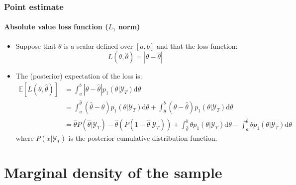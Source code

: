 \documentclass[10pt,slidestop]{beamer}
\newcommand{\AllSample}{ \mathcal Y_T }
\begin{document}
\begin{frame}
  \frametitle{Point estimate}
  \framesubtitle{Absolute value loss function ($L_1$ norm)}
  \begin{itemize}
  \item Suppose that $\theta$ is a scalar defined over $[a,b]$ and
    that the loss function:
    \[
    L(\theta,\widehat{\theta}) = |\theta-\widehat{\theta}|
    \]
  \item The (posterior) expectation of the loss is:
    \medskip
    {\tiny\[
    \begin{split}
      \mathbb  E \left[L(\theta,\widehat{\theta})\right] &=
      \int_a^b|\theta-\widehat{\theta}|p_1(\theta|\AllSample)\mathrm
      d\theta\\
      &=\int_a^{\widehat{\theta}}(\widehat{\theta}-\theta)p_1(\theta|\AllSample)\mathrm
      d\theta + \int_{\widehat{\theta}}^b(\theta-\widehat{\theta})p_1(\theta|\AllSample)\mathrm
      d\theta\\
      &=
      \widehat{\theta}P(\widehat{\theta}|\AllSample)-\widehat{\theta}\left(P(1-\widehat{\theta}|\AllSample)\right)
       +\int_{\widehat{\theta}}^b\theta p_1(\theta|\AllSample)\mathrm
      d\theta-\int_a^{\widehat{\theta}}\theta p_1(\theta|\AllSample)\mathrm
      d\theta
    \end{split}
    \]}
    where $P(x|\AllSample)$ is the posterior cumulative distribution function.
  \end{itemize}

\end{frame}

\section{Marginal density of the sample}
\end{document}
